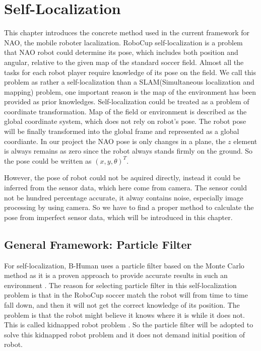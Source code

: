 \chapter{Self-Localization}\label{Chap:PF}
This chapter introduces the concrete method used in the current framework for NAO, the mobile roboter lacalization. RoboCup self-localization is a problem that NAO robot could determine its pose, which includes both position and angular, relative to the given map of the standard soccer field. Almost all the tasks for each robot player require knowledge of its pose on the field. We call this problem as rather a self-localization than a SLAM(Simultaneous localization and mapping) problem, one important reason is the map of the environment has been provided as prior knowledges. Self-localization could be treated as a problem of coordinate transformation. Map of the field or environment is described as the global coordinate system, which does not rely on robot's pose. The robot pose will be finally transformed into the global frame and represented as a global coordiante\cite{thrun2005probabilistic}. In our project the NAO pose is only changes in a plane, the $z$ element is always remains as zero since the robot always stands firmly on the ground. So the pose could be written as $(x,y,\theta)^T$.

However, the pose of robot could not be aquired directly, instead it could be inferred from the sensor data, which here come from camera. The sensor could not be hundred percentage accurate, it alway contains noise, especially image processing by using camera. So we have to find a proper method to calculate the pose from imperfect sensor data, which will be introduced in this chapter.

\section{General Framework: Particle Filter}
For self-localization, B-Human uses a particle filter based on the Monte Carlo method \cite{fox1999monte} as it is a proven approach to provide accurate results in such an environment \cite{rofer2005particle}. The reason for selecting particle filter in this self-localization problem is that in the RoboCup soccer match the robot will from time to time fall down, and then it will not get the correct knowledge of its position. The problem is that the robot might believe it knows where it is while it does not. This is called kidnapped robot problem \cite{thrun2005probabilistic}. So the particle filter will be adopted to solve this kidnapped robot problem and it does not demand initial position of robot.

